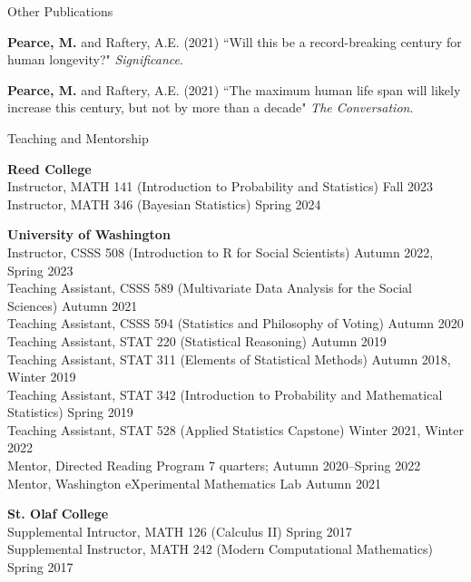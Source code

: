 \documentclass{resume} %
\begin{document}
\begin{rSection}{Other Publications}

\textbf{Pearce, M.} and Raftery, A.E. (2021) ``Will this be a record-breaking century for human longevity?" {\em Significance}.

\textbf{Pearce, M.} and Raftery, A.E. (2021) ``The maximum human life span will likely increase this century, but not by more than a decade" {\em The Conversation}.

\end{rSection}


\begin{rSection}{Teaching and Mentorship}

\textbf{Reed College}
\\ Instructor, MATH 141 (Introduction to Probability and Statistics) \hfill {Fall 2023}
\\ Instructor, MATH 346 (Bayesian Statistics) \hfill {Spring 2024}

\textbf{University of Washington}
\\ Instructor, CSSS 508 (Introduction to R for Social Scientists) \hfill {Autumn 2022, Spring 2023}
\\ Teaching Assistant, CSSS 589 (Multivariate Data Analysis for the Social Sciences) \hfill Autumn 2021
\\ Teaching Assistant, CSSS 594 (Statistics and Philosophy of Voting) \hfill Autumn 2020
\\ Teaching Assistant, STAT 220 (Statistical Reasoning) \hfill {Autumn 2019}
\\ Teaching Assistant, STAT 311 (Elements of Statistical Methods) \hfill {Autumn 2018, Winter 2019}
\\ Teaching Assistant, STAT 342 (Introduction to Probability and Mathematical Statistics) \hfill {Spring 2019}
\\ Teaching Assistant, STAT 528 (Applied Statistics Capstone) \hfill {Winter 2021, Winter 2022}
\\ Mentor, Directed Reading Program \hfill{7 quarters; Autumn 2020--Spring 2022}
\\ Mentor, Washington eXperimental Mathematics Lab \hfill {Autumn 2021}

\textbf{St. Olaf College}
\\ Supplemental Intructor, MATH 126 (Calculus II) \hfill {Spring 2017}
\\ Supplemental Instructor, MATH 242 (Modern Computational Mathematics) \hfill {Spring 2017}

\end{rSection}
\end{document}
